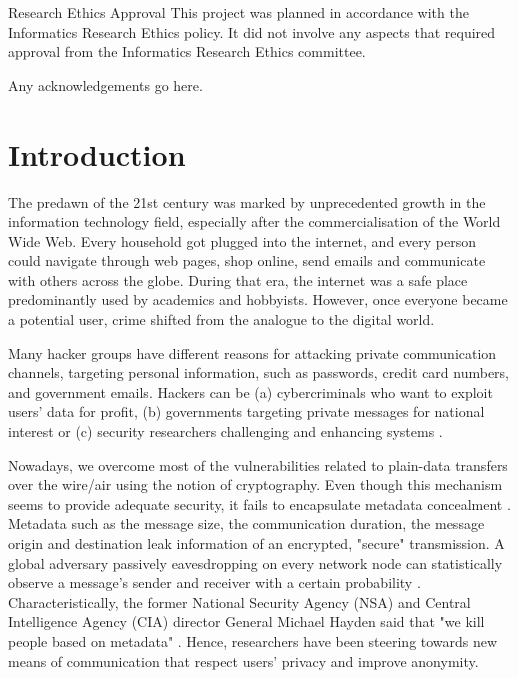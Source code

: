 \documentclass[logo,msc,cyber]{infthesis}   %
\begin{document}
\begin{preliminary}
\newenvironment{ethics}
   {\begin{frontenv}{Research Ethics Approval}{\LARGE}}
   {\end{frontenv}\newpage}

\begin{ethics}
This project was planned in accordance with the Informatics Research
Ethics policy. It did not involve any aspects that required approval
from the Informatics Research Ethics committee.

\standarddeclaration
\end{ethics}


\begin{acknowledgements}
Any acknowledgements go here.
\end{acknowledgements}


\tableofcontents
\end{preliminary}


\chapter{Introduction}

The predawn of the 21st century was marked by unprecedented growth in the
information technology field, especially after the commercialisation of the
World Wide Web. Every household got plugged into the internet, and every person
could navigate through web pages, shop online, send emails and communicate with
others across the globe. During that era, the internet was a safe place
predominantly used by academics and hobbyists. However, once everyone became a
potential user, crime shifted from the analogue to the digital world.

Many hacker groups have different reasons for attacking private communication
channels, targeting personal information, such as passwords, credit card
numbers, and government emails. Hackers can be (a) cybercriminals who want to
exploit users' data for profit, (b) governments targeting private messages for
national interest or (c) security researchers challenging and enhancing systems
\cite{anderson2020security}.


Nowadays, we overcome most of the vulnerabilities related to plain-data
transfers over the wire/air using the notion of cryptography. Even though this
mechanism seems to provide adequate security, it fails to encapsulate metadata
concealment \cite{stallings2018computer}. Metadata such as the message size, the
communication duration, the message origin and destination leak information of
an encrypted, "secure" transmission. A global adversary passively eavesdropping
on every network node can statistically observe a message's sender and receiver
with a certain probability \cite{stallings2018computer}. Characteristically, the
former National Security Agency (NSA) \cite{nsa} and Central Intelligence Agency
(CIA) \cite{cia} director General Michael Hayden said that "we kill people based
on metadata" \cite{granick_2017}. Hence, researchers have been steering towards
new means of communication that respect users' privacy and improve anonymity.
\end{document}
